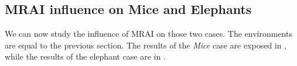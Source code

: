 %

\subsection{MRAI influence on Mice and Elephants}
\label{subsec:bgp_rfd_mrai_influence_mice_elephants}

We can now study the influence of \ac{MRAI} on those two cases.
The environments are equal to the previous section.
The results of the \textit{Mice} case are exposed in ,
while the results of the elephant case are in .

